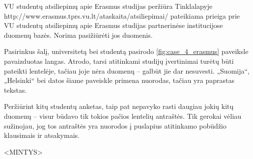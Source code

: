 \begin{xcase}{VU studentų atsiliepimų apie Erasmus studijas peržiūra}
  \xcgoal
  {
    Tinklalapyje http://www.erasmus.tprs.vu.lt/ataskaita/atsiliepimai/
    pateikiama prieiga prie VU studentų atsiliepimų apie Erasmus studijas
    partnerinėse institucijose duomenų bazės. Norima pasižiūrėti jos duomenis.
  }
  
  \xctools
  {
    Pasirinkus šalį, universitetą bei studentą pasirodo
    \ref{fig:case_4_erasmus} paveiksle pavaizduotas langas. Atrodo, tarsi
    atitinkami studijų įvertinimai turėtų būti pateikti lentelėje, tačiau
    joje nėra duomenų – galbūt jie dar nesuvesti. „Suomija“, „Helsinki“ bei
    datos šiame paveiskle primena nuorodas, tačiau yra paprastas tekstas.

  }
  
  \xcresult
  {
    Peržiūrint kitų studentų anketas, taip pat nepavyko rasti daugiau jokių
    kitų duomenų – visur būdavo tik tokios pačios lentelių antraštės. Tik
    gerokai vėliau sužinojau, jog tos antraštės yra nuorodos į puslapius
    atitinkamo pobūdžio klausimais ir atsakymais.
  }
  
  \xcprinciples
  {
  }
  
  \xcthoughts
  {
    <MINTYS>
  }
\end{xcase}
